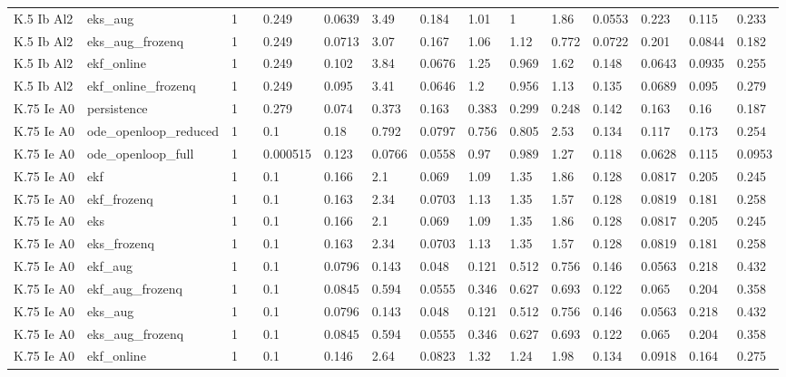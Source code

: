 \begin{table}[t]
\begin{tabular}{lllllllllllllll}
K.5 Ib Al2 & eks\_aug & 1 &  & 0.249 & 0.0639 & 3.49 & 0.184 & 1.01 & 1 & 1.86 & 0.0553 & 0.223 & 0.115 & 0.233 \\
K.5 Ib Al2 & eks\_aug\_frozenq & 1 &  & 0.249 & 0.0713 & 3.07 & 0.167 & 1.06 & 1.12 & 0.772 & 0.0722 & 0.201 & 0.0844 & 0.182 \\
K.5 Ib Al2 & ekf\_online & 1 &  & 0.249 & 0.102 & 3.84 & 0.0676 & 1.25 & 0.969 & 1.62 & 0.148 & 0.0643 & 0.0935 & 0.255 \\
K.5 Ib Al2 & ekf\_online\_frozenq & 1 &  & 0.249 & 0.095 & 3.41 & 0.0646 & 1.2 & 0.956 & 1.13 & 0.135 & 0.0689 & 0.095 & 0.279 \\
K.75 Ie A0 & persistence & 1 &  & 0.279 & 0.074 & 0.373 & 0.163 & 0.383 & 0.299 & 0.248 & 0.142 & 0.163 & 0.16 & 0.187 \\
K.75 Ie A0 & ode\_openloop\_reduced & 1 &  & 0.1 & 0.18 & 0.792 & 0.0797 & 0.756 & 0.805 & 2.53 & 0.134 & 0.117 & 0.173 & 0.254 \\
K.75 Ie A0 & ode\_openloop\_full & 1 &  & 0.000515 & 0.123 & 0.0766 & 0.0558 & 0.97 & 0.989 & 1.27 & 0.118 & 0.0628 & 0.115 & 0.0953 \\
K.75 Ie A0 & ekf & 1 &  & 0.1 & 0.166 & 2.1 & 0.069 & 1.09 & 1.35 & 1.86 & 0.128 & 0.0817 & 0.205 & 0.245 \\
K.75 Ie A0 & ekf\_frozenq & 1 &  & 0.1 & 0.163 & 2.34 & 0.0703 & 1.13 & 1.35 & 1.57 & 0.128 & 0.0819 & 0.181 & 0.258 \\
K.75 Ie A0 & eks & 1 &  & 0.1 & 0.166 & 2.1 & 0.069 & 1.09 & 1.35 & 1.86 & 0.128 & 0.0817 & 0.205 & 0.245 \\
K.75 Ie A0 & eks\_frozenq & 1 &  & 0.1 & 0.163 & 2.34 & 0.0703 & 1.13 & 1.35 & 1.57 & 0.128 & 0.0819 & 0.181 & 0.258 \\
K.75 Ie A0 & ekf\_aug & 1 &  & 0.1 & 0.0796 & 0.143 & 0.048 & 0.121 & 0.512 & 0.756 & 0.146 & 0.0563 & 0.218 & 0.432 \\
K.75 Ie A0 & ekf\_aug\_frozenq & 1 &  & 0.1 & 0.0845 & 0.594 & 0.0555 & 0.346 & 0.627 & 0.693 & 0.122 & 0.065 & 0.204 & 0.358 \\
K.75 Ie A0 & eks\_aug & 1 &  & 0.1 & 0.0796 & 0.143 & 0.048 & 0.121 & 0.512 & 0.756 & 0.146 & 0.0563 & 0.218 & 0.432 \\
K.75 Ie A0 & eks\_aug\_frozenq & 1 &  & 0.1 & 0.0845 & 0.594 & 0.0555 & 0.346 & 0.627 & 0.693 & 0.122 & 0.065 & 0.204 & 0.358 \\
K.75 Ie A0 & ekf\_online & 1 &  & 0.1 & 0.146 & 2.64 & 0.0823 & 1.32 & 1.24 & 1.98 & 0.134 & 0.0918 & 0.164 & 0.275 \\

\end{tabular}
\end{table}
